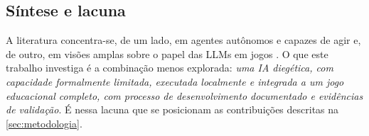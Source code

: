 \subsection{Síntese e lacuna}

A literatura concentra-se, de um lado, em agentes autônomos e capazes de agir
\citep{park2023generative,wang2023voyager} e, de outro, em visões amplas sobre
o papel das LLMs em jogos \citep{gallotta2024largelanguage}. O que este
trabalho investiga é a combinação menos explorada: \emph{uma IA diegética, com
capacidade formalmente limitada, executada localmente e integrada a um jogo
educacional completo, com processo de desenvolvimento documentado e
evidências de validação}. É nessa lacuna que se posicionam as contribuições
descritas na \autoref{sec:metodologia}.
